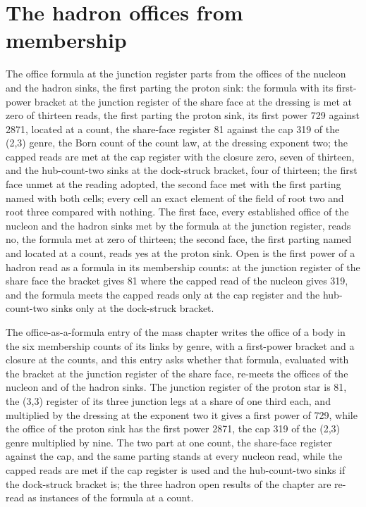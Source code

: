\section{The hadron offices from membership}\label{mod:VII-6-D543708-w-hdom}
\begin{chwall}\label{box:VII-6-D543708-w-hdom:1}
The office formula at the junction register parts from the offices of the nucleon and the hadron sinks, the first parting the proton sink: the formula with its first-power bracket at the junction register of the share face at the dressing is met at zero of thirteen reads, the first parting the proton sink, its first power 729 against 2871, located at a count, the share-face register 81 against the cap 319 of the (2,3) genre, the Born count of the count law, at the dressing exponent two; the capped reads are met at the cap register with the closure zero, seven of thirteen, and the hub-count-two sinks at the dock-struck bracket, four of thirteen; the first face unmet at the reading adopted, the second face met with the first parting named with both cells; every cell an exact element of the field of root two and root three compared with nothing.
The first face, every established office of the nucleon and the hadron sinks met by the formula at the junction register, reads no, the formula met at zero of thirteen; the second face, the first parting named and located at a count, reads yes at the proton sink. Open is the first power of a hadron read as a formula in its membership counts: at the junction register of the share face the bracket gives 81 where the capped read of the nucleon gives 319, and the formula meets the capped reads only at the cap register and the hub-count-two sinks only at the dock-struck bracket.
\end{chwall}
The office-as-a-formula entry of the mass chapter writes the office of a body in the six membership counts of its links by genre, with a first-power bracket and a closure at the counts, and this entry asks whether that formula, evaluated with the bracket at the junction register of the share face, re-meets the offices of the nucleon and of the hadron sinks. The junction register of the proton star is 81, the (3,3) register of its three junction legs at a share of one third each, and multiplied by the dressing at the exponent two it gives a first power of 729, while the office of the proton sink has the first power 2871, the cap 319 of the (2,3) genre multiplied by nine. The two part at one count, the share-face register against the cap, and the same parting stands at every nucleon read, while the capped reads are met if the cap register is used and the hub-count-two sinks if the dock-struck bracket is; the three hadron open results of the chapter are re-read as instances of the formula at a count.
